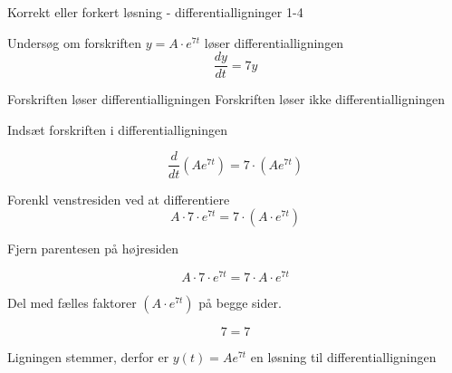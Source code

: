 \documentclass{article}
\begin{document}
\begin{exercise}{Korrekt eller forkert løsning - differentialligninger 1-4}


Undersøg om forskriften $y = A \cdot e^{7t}$ løser differentialligningen
\[
\frac{dy}{dt} = 7y
\]

\begin{multichoice}
\itemtrue Forskriften løser differentialligningen
\itemfalse Forskriften løser ikke differentialligningen
\end{multichoice}
\hint

Indsæt forskriften i differentialligningen

\hint
\[
\frac{d}{dt} \left( A e^{7t}\right) = 7 \cdot \left( A e^{7t} \right)
\]


\hint

Forenkl venstresiden ved at differentiere
\[
A \cdot 7 \cdot e^{7t} = 7 \cdot \left(A \cdot e^{7t} \right)
\]

\hint

Fjern parentesen på højresiden

\hint
\[
A \cdot 7 \cdot e^{7t} = 7 \cdot A \cdot e^{7t}
\]

\hint
Del med fælles faktorer $\left( A \cdot e^{7t} \right)$ på begge sider.

\hint

\[
7 = 7
\]


\hint

Ligningen stemmer, derfor er $y(t) = A e^{7t}$ en løsning til differentialligningen

\end{exercise}

\newpage
\end{document}
